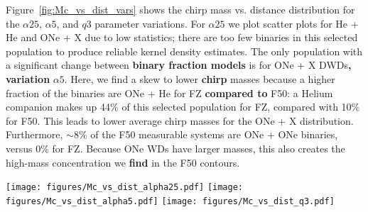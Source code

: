 \documentclass[twocolumn]{aastex631}
\begin{document}
Figure~\ref{fig:Mc_vs_dist_vars} shows the chirp mass vs. distance distribution for the $\alpha25$, $\alpha5$, and $q3$ parameter variations. For $\alpha25$ we plot scatter plots for He + He and ONe + X due to low statistics; there are too few binaries in this selected population to produce reliable kernel density estimates. The only population with a significant change between \textbf{binary fraction models} is for ONe + X DWDs\textbf{, variation} $\alpha5$. Here, we find a skew to lower \textbf{chirp} masses because a higher fraction of the binaries are ONe + He for FZ \textbf{compared to} F50: a Helium companion makes up 44\% of this selected population for FZ, compared with 10\% for F50. This leads to lower average chirp masses for the ONe + X distribution. Furthermore, $\sim8$\% of the F50 measurable systems are ONe + ONe binaries, versus 0\% for FZ. Because ONe WDs have larger masses, this also creates the high-mass concentration we \textbf{find} in the F50 contours.
\begin{figure*}[h]
    \centering
	\texttt{[image: figures/Mc\_vs\_dist\_alpha25.pdf]}
	\texttt{[image: figures/Mc\_vs\_dist\_alpha5.pdf]}
	\texttt{[image: figures/Mc\_vs\_dist\_q3.pdf]}
    \caption{Chirp mass -- distance distributions for our other three binary evolution parameter variations. We plot the $\alpha25$ populations of He + He and ONe + X DWDs as scatter points since there are too few binaries to produce meaningful density distributions. Again, we have plotted each DWD type's population that exhibit observable GW frequency evolution and have $\rm{SNR}>7$. Contours show the 5$^{\rm{th}}$, 25$^{\rm{th}}$, 50$^{\rm{th}}$, 75$^{\rm{th}}$ and 95$^{\rm{th}}$ percentiles. Most populations remain unchanged between binary fraction models except for ONe + X DWDs in $\alpha5$, due to the number of He vs. CO vs. ONe companions between each model.}
    \label{fig:Mc_vs_dist_vars}
\end{figure*}
\end{document}
